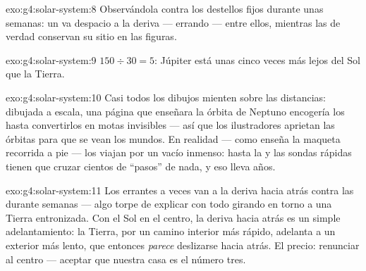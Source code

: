 \begin{solution}{exo:g4:solar-system:8}
Observándola contra los destellos fijos durante unas semanas: un
 va despacio a la deriva --- errando --- entre ellos, mientras
las  de verdad conservan su sitio en las figuras.
\end{solution}

\begin{solution}{exo:g4:solar-system:9}
$150 \div 30 = 5$: Júpiter está unas cinco veces más lejos del Sol
que la Tierra.
\end{solution}

\begin{solution}{exo:g4:solar-system:10}
Casi todos los dibujos mienten sobre las distancias: dibujada a
escala, una página que enseñara la órbita de Neptuno encogería los
 hasta convertirlos en motas invisibles --- así que los
ilustradores aprietan las órbitas para que se vean los mundos. En
realidad --- como enseña la maqueta recorrida a pie --- los
 viajan por un vacío inmenso: hasta la  y las sondas
rápidas tienen que cruzar cientos de ``pasos'' de nada, y eso lleva
años.
\end{solution}

\begin{solution}{exo:g4:solar-system:11}
Los errantes a veces van a la deriva hacia atrás contra las
 durante semanas --- algo torpe de explicar con todo girando
en torno a una Tierra entronizada. Con el Sol en el centro, la deriva
hacia atrás es un simple adelantamiento: la Tierra, por un camino
interior más rápido, adelanta a un  exterior más lento, que
entonces \emph{parece} deslizarse hacia atrás. El precio: renunciar al
centro --- aceptar que nuestra casa es el  número tres.
\end{solution}
